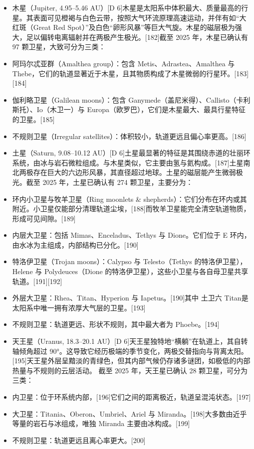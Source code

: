 \begin{itemize}
\item 木星（Jupiter, 4.95–5.46 AU）[D 6]木星是太阳系中体积最大、质量最高的行星。其表面可见橙褐与白色云带，按照大气环流原理高速运动，并伴有如“大红斑（Great Red Spot）”及白色“卵形风暴”等巨大气旋。木星的磁层极为强大，足以偏转电离辐射并在两极产生极光。[182]截至 2025 年，木星已确认有 97 颗卫星，大致可分为三类：  
\item 阿玛尔忒亚群（Amalthea group）：包含 Metis、Adrastea、Amalthea 与 Thebe，它们的轨道显著近于木星，且其物质构成了木星微弱的行星环。[183][184]  
\item 伽利略卫星（Galilean moons）：包含 Ganymede（盖尼米得）、Callisto（卡利斯托）、Io（木卫一）与 Europa（欧罗巴），它们是木星最大、最具行星特征的卫星。[185]  
\item 不规则卫星（Irregular satellites）：体积较小，轨道更远且偏心率更高。[186]  
\end{itemize}
\begin{itemize}
\item 土星（Saturn, 9.08–10.12 AU）[D 6]土星最显著的特征是其围绕赤道的壮丽环系统，由冰与岩石微粒组成。与木星类似，它主要由氢与氦构成。[187]土星南北两极存在巨大的六边形风暴，其直径超过地球。土星的磁层能产生微弱极光。截至 2025 年，土星已确认有 274 颗卫星，主要分为：  
\item 环内小卫星与牧羊卫星（Ring moonlets & shepherds）：它们分布在环内或其附近。小卫星仅能部分清理轨道尘埃，[188]而牧羊卫星能完全清空轨道物质，形成可见间隙。[189]  
\item 内层大卫星：包括 Mimas、Enceladus、Tethys 与 Dione。它们位于 E 环内，由水冰为主组成，内部结构已分化。[190]  
\item 特洛伊卫星（Trojan moons）：Calypso 与 Telesto（Tethys 的特洛伊卫星），Helene 与 Polydeuces（Dione 的特洛伊卫星），这些小卫星与各自母卫星共享轨道。[191][192]  
\item 外层大卫星：Rhea、Titan、Hyperion 与 Iapetus。[190]其中 土卫六 Titan是太阳系中唯一拥有浓厚大气层的卫星。[193]  
\item 不规则卫星：轨道更远、形状不规则，其中最大者为 Phoebe。[194]  
\end{itemize}
\begin{itemize}
\item 天王星（Uranus, 18.3–20.1 AU）[D 6]天王星独特地“横躺”在轨道上，其自转轴倾角超过 90°。这导致它经历极端的季节变化，两极交替指向与背离太阳。[195]天王星外层呈黯淡的青绿色，但其内部气候仍存诸多谜团，如极低的内部热量与不规则的云层活动。  
截至 2025 年，天王星已确认 28 颗卫星，可分为三类：  
\item 内卫星：位于环系统内部，[196]它们之间的距离极近，轨道呈混沌状态。[197]  
\item 大卫星：Titania、Oberon、Umbriel、Ariel 与 Miranda。[198]大多数由近乎等量的岩石与冰组成，唯独 Miranda 主要由冰构成。[199]  
\item 不规则卫星：轨道更远且离心率更大。[200]  
\end{itemize}
